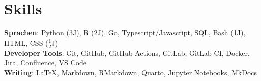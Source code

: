 \section{Skills}

\begin{itemize}[leftmargin=0.15in, label={}]
    \small{\item{
                    \textbf{Sprachen}{: Python (3J), R (2J), Go, Typescript/Javascript, SQL, Bash (1J), HTML, CSS ($\frac{1}{2}$J)} \\
                    \textbf{Developer Tools}{: Git, GitHub, GitHub Actions, GitLab, GitLab CI, Docker, Jira, Confluence, VS Code} \\
                    \textbf{Writing}{: LaTeX, Markdown, RMarkdown, Quarto, Jupyter Notebooks, MkDocs}
              }}
\end{itemize}
